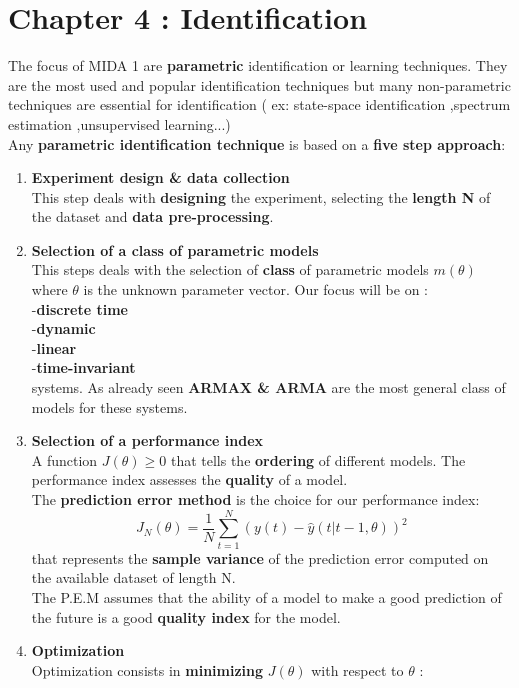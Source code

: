 \section{Chapter 4 : Identification}
The focus of MIDA 1 are \textbf{parametric} identification or learning techniques.
They are the most used and popular identification techniques but many non-parametric techniques are essential for identification ( ex: state-space identification ,spectrum estimation ,unsupervised learning...)\\
Any \textbf{parametric identification technique} is based on a \textbf{five step approach}:
\begin{enumerate}
\item \textbf{Experiment design \& data collection}\\
This step deals with \textbf{designing} the experiment, selecting the \textbf{length N} of the dataset and \textbf{data pre-processing}.
\item \textbf{Selection of a class of parametric models}\\
This steps deals with the selection of \textbf{class} of parametric models $m(\theta)$ where $\theta$ is the unknown parameter vector. Our focus will be on :\\
-\textbf{discrete time}\\
-\textbf{dynamic}\\
-\textbf{linear}\\
-\textbf{time-invariant}\\
systems. As already seen \textbf{ARMAX \& ARMA} are the most general class of models for these systems.
\item \textbf{Selection of a performance index}\\
A function $J(\theta) \geq 0 $ that tells the \textbf{ordering} of different models.
The performance index assesses the \textbf{quality} of a model.\\
The \textbf{prediction error method} is the choice for our performance index:
\[
\boxed{J_N(\theta) = \frac{1}{N} \sum\limits_{t=1}^{N}(y(t)-\hat{y}(t|t-1,\theta))^2}
\]
that represents the \textbf{sample variance} of the prediction error computed on the available dataset of length N.\\
The P.E.M assumes that the ability of a model to make a good prediction of the future is a good \textbf{quality index} for the model.\\
\item \textbf{Optimization}\\
Optimization consists in \textbf{minimizing} $J(\theta)$ with respect to $\theta$ :

\end{enumerate}
